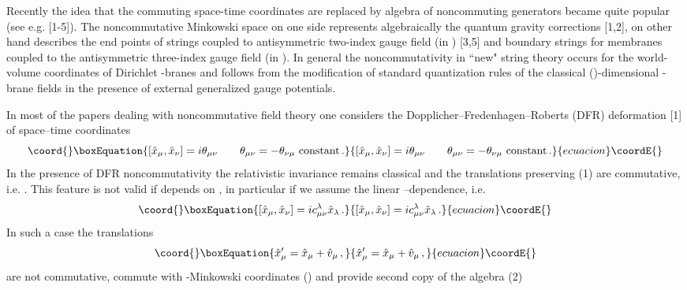 \documentclass[a4paper,a4paper]{article}
\begin{document}
Recently the idea that the commuting space-time coordinates
\coordHE{} are replaced by algebra of noncommuting
generators \coordHE{} became quite popular (see e.g.
[1-5]). The noncommutative Minkowski space on one side 
represents 
algebraically the quantum gravity corrections [1,2], on other hand
describes the end points of strings coupled to antisymmetric
two-index gauge field \coordHE{} (in \coordHE{}) [3,5] and boundary
strings for membranes coupled to the antisymmetric three-index
gauge field \coordHE{} (in \coordHE{}). In general the
noncommutativity in ``new" string theory occurs for the
\coordHE{} world-volume 
 coordinates of Dirichlet \coordHE{}-branes and follows from the
modification of standard quantization rules of the classical
(\coordHE{})-dimensional \coordHE{}-brane fields in the presence of external
generalized gauge potentials.


In most of the papers dealing with noncommutative field theory
one considers the Dopplicher--Fredenhagen--Roberts (DFR)
deformation [1] of space--time coordinates
\begin{equation}\coord{}\boxEquation{
\left[ \hat{x}_{\mu}, \hat{x}_{\nu}\right] = i\theta_{\mu\nu} 
\qquad \theta_{\mu\nu} =- \theta_{\nu\mu} \ \mbox{constant}\, .
 }{
\left[ \hat{x}_{\mu}, \hat{x}_{\nu}\right] = i\theta_{\mu\nu} 
\qquad \theta_{\mu\nu} =- \theta_{\nu\mu} \ \mbox{constant}\, .
 }{ecuacion}\coordE{}\end{equation}
  In the presence of DFR noncommutativity the relativistic
invariance remains classical and the translations \coordHE{} preserving
(1) are commutative, i.e. \coordHE{}. This feature is
not valid if  \myHighlight{$\theta_{\mu\nu}$}\coordHE{} depends on \coordHE{}, in particular if we assume  the linear 
\coordHE{}--dependence, i.e.
\begin{equation}\coord{}\boxEquation{
\left[ \hat{x}_{\mu}, \hat{x}_{\nu}\right] = i c_{\mu\nu} ^{\lambda}
\hat{x}_{\lambda}\, .
}{
\left[ \hat{x}_{\mu}, \hat{x}_{\nu}\right] = i c_{\mu\nu} ^{\lambda}
\hat{x}_{\lambda}\, .
}{ecuacion}\coordE{}\end{equation}
In such a case the translations 
\begin{equation}\coord{}\boxEquation{
 \hat{x}_{\mu}^{\prime} 
 = \hat{x}_{\mu} + 
\hat{v}_{\mu}\, ,
}{
 \hat{x}_{\mu}^{\prime} 
 = \hat{x}_{\mu} + 
\hat{v}_{\mu}\, ,
}{ecuacion}\coordE{}\end{equation}
are not commutative, 
commute with \myHighlight{$\kappa$}\coordHE{}-Minkowski coordinates (\coordHE{}) 
 and provide second copy of the algebra (2)
\end{document}
